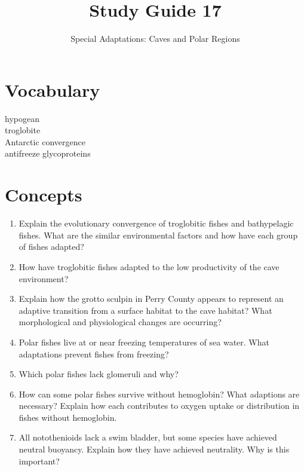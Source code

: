 \documentclass[letterpaper]{tufte-handout}
\title{Study Guide 17}
\author{Special Adaptations: Caves and Polar Regions}
\date{} %
\begin{document}
\maketitle	%


\section{Vocabulary} 
\vspace{-1\baselineskip}
\begin{multicols}{2}
hypogean \\
troglobite \\
Antarctic convergence \\
antifreeze glycoproteins
\end{multicols}

\section{Concepts}

\begin{enumerate}
	\item Explain the evolutionary convergence of troglobitic fishes and bathypelagic fishes.  What are the similar environmental factors and how have each group of fishes adapted?

	\item How have troglobitic fishes adapted to the low productivity of the cave environment?

	\item Explain how the grotto sculpin in Perry County appears to represent an adaptive transition from a surface habitat to the cave habitat?  What morphological and physiological changes are occurring?

	\item Polar fishes live at or near freezing temperatures of sea water.  What adaptations prevent fishes from freezing?

	\item Which polar fishes lack glomeruli and why?

	\item How can some polar fishes survive without hemoglobin?  What adaptions are necessary?  Explain how each contributes to oxygen uptake or distribution in fishes without hemoglobin.

	\item All notothenioids lack a swim bladder, but some species have achieved neutral buoyancy.  Explain how they have achieved neutrality.  Why is this important?
	
\end{enumerate}
\end{document}
